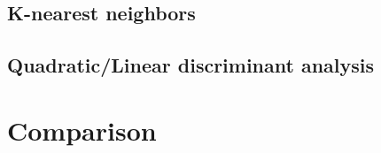 \documentclass[12pt]{article}
\begin{document}
\subsection{K-nearest neighbors}
\subsection{Quadratic/Linear discriminant analysis}
\section{Comparison}
\end{document}
